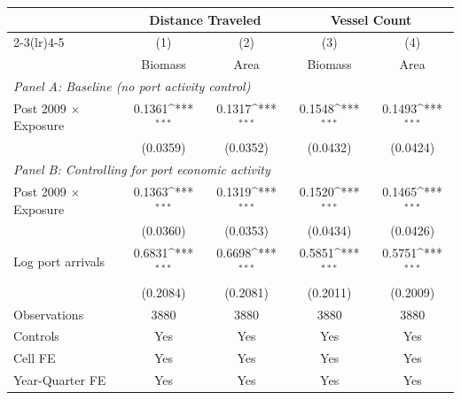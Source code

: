 \def\sym#1{\ifmmode^{#1}\else\(^{#1}\)\fi}
\begin{tabular}{l*{4}{c}}
\hline\hline
                    &\multicolumn{2}{c}{Distance Traveled}&\multicolumn{2}{c}{Vessel Count}\\
                    \cmidrule(lr){2-3}\cmidrule(lr){4-5}
                    &\multicolumn{1}{c}{(1)}&\multicolumn{1}{c}{(2)}&\multicolumn{1}{c}{(3)}&\multicolumn{1}{c}{(4)}\\
                    &\multicolumn{1}{c}{Biomass}&\multicolumn{1}{c}{Area}&\multicolumn{1}{c}{Biomass}&\multicolumn{1}{c}{Area}\\
\hline
\multicolumn{5}{l}{\textit{Panel A: Baseline (no port activity control)}}\\[0.3em]
Post 2009 $\times$ Exposure&     0.1361\sym{***}&     0.1317\sym{***}&     0.1548\sym{***}&     0.1493\sym{***}\\
                    &             (0.0359)&             (0.0352)&             (0.0432)&             (0.0424)\\
[0.8em]
\multicolumn{5}{l}{\textit{Panel B: Controlling for port economic activity}}\\[0.3em]
Post 2009 $\times$ Exposure&     0.1363\sym{***}&     0.1319\sym{***}&     0.1520\sym{***}&     0.1465\sym{***}\\
                    &             (0.0360)&             (0.0353)&             (0.0434)&             (0.0426)\\
[0.3em]
Log port arrivals   &     0.6831\sym{***}&     0.6698\sym{***}&     0.5851\sym{***}&     0.5751\sym{***}\\
                    &             (0.2084)&             (0.2081)&             (0.2011)&             (0.2009)\\
[0.5em]
\hline
Observations        &      3880         &      3880         &      3880         &      3880         \\
Controls            &         Yes         &         Yes         &         Yes         &         Yes         \\
Cell FE             &         Yes         &         Yes         &         Yes         &         Yes         \\
Year-Quarter FE     &         Yes         &         Yes         &         Yes         &         Yes         \\
\hline\hline
\end{tabular}